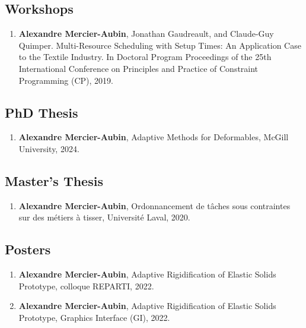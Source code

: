 \documentclass[10pt]{article} %
\begin{document}
\subsection{Workshops}
\begin{enumerate}
\setcounter{enumi}{\value{listCounter}}
\item \textbf{Alexandre Mercier-Aubin}, Jonathan Gaudreault, and Claude-Guy Quimper. Multi-Resource Scheduling with Setup Times: An Application Case to the Textile Industry. In Doctoral Program Proceedings of the 25th International Conference on Principles and Practice of Constraint Programming (CP), 2019. %

\end{enumerate}

\subsection{PhD Thesis}
\begin{enumerate}
\setcounter{enumi}{\value{listCounter}}
\item \textbf{Alexandre Mercier-Aubin}, Adaptive Methods for Deformables, McGill University, 2024. 
\end{enumerate}

\subsection{Master's Thesis}
\begin{enumerate}
\setcounter{enumi}{\value{listCounter}}
\item \textbf{Alexandre Mercier-Aubin}, Ordonnancement de tâches sous contraintes sur des métiers à tisser, Université Laval, 2020. 
\end{enumerate}


\subsection{Posters}
\begin{enumerate}
\setcounter{enumi}{\value{listCounter}}
\item \textbf{Alexandre Mercier-Aubin}, Adaptive Rigidification of Elastic Solids Prototype, colloque REPARTI, 2022. 
\item \textbf{Alexandre Mercier-Aubin}, Adaptive Rigidification of Elastic Solids Prototype, Graphics Interface (GI), 2022. 
\end{enumerate}
\end{document}
